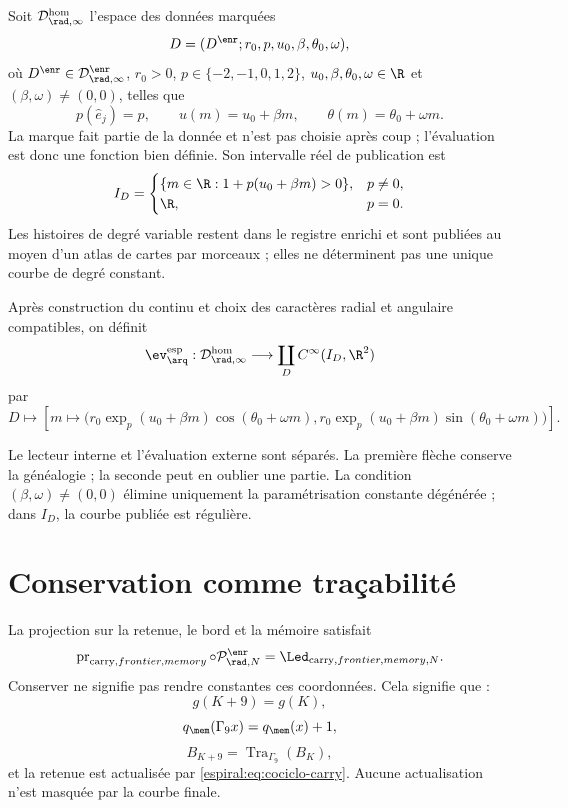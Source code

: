 \begin{definition}
Soit \(\mathcal D_{\rad,\infty}^{\mathrm{hom}}\) l'espace des données marquées
\[
 D=(D^{\enr};r_0,p,u_0,\beta,\theta_0,\omega),
\]
où \(D^{\enr}\in\mathcal D_{\rad,\infty}^{\enr}\), \(r_0>0\), \(p\in\{-2,-1,0,1,2\}\), \(u_0,\beta,\theta_0,\omega\in\R\) et \((\beta,\omega)\neq(0,0)\), telles que
\[
 p(\widehat e_j)=p,\qquad
 u(m)=u_0+\beta m,\qquad
 \theta(m)=\theta_0+\omega m.
\]
La marque fait partie de la donnée et n'est pas choisie après coup ; l'évaluation est donc une fonction bien définie.
Son intervalle réel de publication est
\[
 I_D=
 \begin{cases}
 \{m\in\R:1+p(u_0+\beta m)>0\},&p\neq0,\\
 \R,&p=0.
 \end{cases}
\]
Les histoires de degré variable restent dans le registre enrichi et sont publiées au moyen d'un atlas de cartes par morceaux ; elles ne déterminent pas une unique courbe de degré constant.
\end{definition}

\begin{definition}
Après construction du continu et choix des caractères radial et angulaire compatibles, on définit
\[
 \ev_{\arq}^{\mathrm{esp}}:
 \mathcal D_{\rad,\infty}^{\mathrm{hom}}\longrightarrow
 \coprod_{D}C^\infty(I_D,\R^2)
\]
par
\[
 D\longmapsto
 \left[m\longmapsto
 \bigl(r_0\exp_{p}(u_0+\beta m)\cos(\theta_0+\omega m),
 r_0\exp_{p}(u_0+\beta m)\sin(\theta_0+\omega m)\bigr)\right].
\]
\end{definition}

Le lecteur interne et l'évaluation externe sont séparés. La première flèche conserve la généalogie ; la seconde peut en oublier une partie. La condition \((\beta,\omega)\neq(0,0)\) élimine uniquement la paramétrisation constante dégénérée ; dans \(I_D\), la courbe publiée est régulière.

\section{Conservation comme traçabilité}

La projection sur la retenue, le bord et la mémoire satisfait
\[
 \operatorname{pr}_{\mathrm{carry},frontier,memory}
 \circ\mathcal P_{\rad,N}^{\enr}
 =\Led_{{\mathrm{carry},frontier,memory},N}.
\]
Conserver ne signifie pas rendre constantes ces coordonnées. Cela signifie que :
\[
 g(K+9)=g(K),
\]
\[
 q_{\mem}(\Gamma_9x)=q_{\mem}(x)+1,
\]
\[
 B_{K+9}=\operatorname{Tra}_{\Gamma_9}(B_K),
\]
et la retenue est actualisée par \cref{espiral:eq:cociclo-carry}. Aucune actualisation n'est masquée par la courbe finale.

